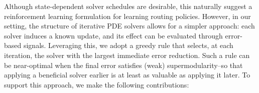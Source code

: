 \documentclass{article}
\newcommand{\ambuj}[1]{\textcolor{red}{AT: #1}}
\begin{document}
Although state-dependent solver schedules are desirable, this naturally suggest a reinforcement learning formulation for learning routing policies. However, in our setting, the structure of iterative PDE solvers allows for a simpler approach: each solver induces a known update, and its effect can be evaluated through error-based signals.
Leveraging this, we adopt a greedy rule that selects, at each iteration, the solver with the largest immediate error reduction.
Such a rule can be near-optimal when the final error satisfies (weak) supermodularity--so that applying a beneficial solver earlier is at least as valuable as applying it later. To support this approach, we make the following contributions:
\end{document}
